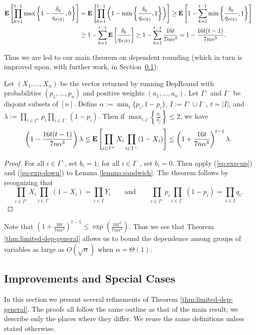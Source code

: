 \begin{align}
\text{\bf E}\left[\prod_{k=1}^{t-1} \max\left\{1 - \frac{\delta_k}{q_{\sigma(k)}},0\right\} \right]
&= \text{\bf E}\left[\prod_{k=1}^{t-1} \left(1-\min\left\{\frac{\delta_k}{q_{\sigma(k)}},1\right\}\right)\right]
\ge \text{\bf E}\left[1-\sum_{k=1}^{t-1} \min\left\{\frac{\delta_k}{q_{\sigma(k)}},1\right\}\right]
\nonumber\\ &\ge 1-\sum_{k=1}^{t-1} \text{\bf E}\left[\frac{\delta_k}{q_{\sigma(k)}}\right]
\ge 1-\sum_{k=1}^{t-1} \frac{16t}{7n\alpha^3}
= 1-\frac{16t(t-1)}{7n\alpha^3}.
\label{eq:exp-down}\end{align}

Thus we are led to our main theorem on dependent rounding (which in turn is improved upon, with further work, in Section~\ref{sec:dep-round-special}): 

\begin{theorem}\label{thm:limited-dep-general}
Let $(X_1,\ldots,X_n)$ be the vector returned by running {\sc DepRound} with probabilities $(p_1,\ldots,\allowbreak p_n)$ and positive weights $(a_1,\ldots,a_n)$. Let $I^+$ and $I^-$ be disjoint subsets of $[n]$. Define $\alpha:=\min_i\{p_i,1-p_i\}$, $I:=I^+\cup I^-$, $t = |I|$, and $\lambda:=\displaystyle\prod_{i\in I^+}p_i\prod_{i\in I^-}(1-p_i)$. Then if $\displaystyle \max_{i,j}\left\{\frac{a_i}{a_j}\right\}\le 2$, we have
\[ \left(1-\frac{16t(t-1)}{7n\alpha^3}\right) \lambda 
\le \text{\bf E}\left[\prod_{i\in I^+} X_i \prod_{i \in I^-}(1-X_i) \right] 
\le\left(1+\frac{16t}{7n\alpha^3}\right)^{t-1} \lambda.\]
\end{theorem}
\begin{proof}
For all $i\in I^+$, set $b_i=1$; for all $i\in I^-$, set $b_i=0$. Then apply (\ref{eq:exp-up}) and (\ref{eq:exp-down}) to Lemma \ref{lemma:sandwich}. The theorem follows by recognizing that
\begin{equation*}
 \prod_{i\in I^+} X_i \prod_{i \in I^-}(1-X_i) = \prod_{i\in I} Y_i \qquad\text{and}\qquad
	\prod_{i\in I^+}p_i\prod_{i\in I^-}(1-p_i) = \prod_{i\in I}q_i
.\end{equation*}
\end{proof}
Note that $\left(1+\frac{16t}{7n\alpha^3}\right)^{t-1}\le\exp\left(\frac{16t^2}{7n\alpha^3}\right)$. Thus we see that Theorem \ref{thm:limited-dep-general} allows us to bound the dependence among groups of variables as large as $O(\sqrt{n})$ when $\alpha = \Theta(1)$.
\subsection{Improvements and Special Cases}
\label{sec:dep-round-special}
In this section we present several refinements of Theorem \ref{thm:limited-dep-general}. The proofs all follow the same outline as that of the main result; we describe only the places where they differ.  We reuse the same definitions unless stated otherwise.

